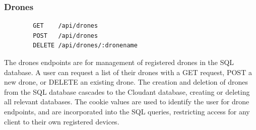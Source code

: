 \documentclass{article}
\begin{document}
\subsubsection{Drones}
\begin{center}
	\begin{lstlisting}
		GET    /api/drones
		POST   /api/drones
		DELETE /api/drones/:dronename
	\end{lstlisting}
\end{center}
The drones endpoints are for management of registered drones in the SQL database. A user can request a list of their drones with a GET request, POST a new drone, or DELETE an existing drone. The creation and deletion of drones from the SQL database cascades to the Cloudant database, creating or deleting all relevant databases. The cookie values are used to identify the user for drone endpoints, and are incorporated into the SQL queries, restricting access for any client to their own registered devices. 
\end{document}
